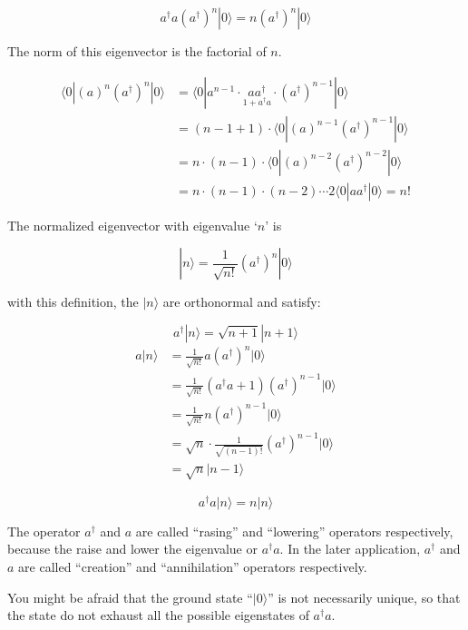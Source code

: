 ﻿\documentclass[twoside]{book}
\numberwithin{equation}{section}
\begin{document}
\[a^{\dagger}a(a^{\dagger})^n|0\rangle = n(a^{\dagger})^n|0\rangle \]

The norm of this eigenvector is the factorial of $n$.

\[\begin{split}
\langle 0|(a)^n(a^{\dagger})^n|0\rangle &=  \langle 0|a^{n-1}\cdot \underset{1+a^{\dagger}a}{aa^{\dagger}}\cdot(a^{\dagger})^{n-1}|0\rangle\\
&= (n-1+1)\cdot\langle 0|(a)^{n-1}(a^{\dagger})^{n-1}|0\rangle\\
&= n\cdot(n-1)\cdot\langle 0|(a)^{n-2}(a^{\dagger})^{n-2}|0\rangle\\
&= n\cdot(n-1)\cdot(n-2)\cdots 2 \langle 0|aa^{\dagger}|0\rangle = n!
\end{split}\]

The normalized eigenvector with eigenvalue `$n$' is

\begin{equation}
|n\rangle = \frac{1}{\sqrt{n!}}(a^{\dagger})^n|0\rangle
\end{equation}

with this definition, the $|n\rangle$ are orthonormal and satisfy:

\begin{equation}\label{1.1.2}
a^{\dagger}|n\rangle = \sqrt{n+1}|n+1\rangle
\end{equation}
\begin{equation}\label{1.1.3}
\begin{split}
a|n\rangle &= \frac{1}{\sqrt{n!}}a(a^{\dagger})^n|0\rangle\\
&=\frac{1}{\sqrt{n!}}(a^{\dagger}a+1)(a^{\dagger})^{n-1}|0\rangle\\
&=\frac{1}{\sqrt{n!}}n(a^{\dagger})^{n-1}|0\rangle\\
&=\sqrt{n}\cdot\frac{1}{\sqrt{(n-1)!}}(a^{\dagger})^{n-1}|0\rangle\\
&=\sqrt{n}|n-1\rangle
\end{split}
\end{equation}

\[a^{\dagger}a|n\rangle = n|n\rangle \]

The operator $a^{\dagger}$ and $a$ are called ``rasing'' and ``lowering'' operators respectively, because the raise and lower the eigenvalue or $a^{\dagger}a$.
In the later application, $a^{\dagger}$ and $a$ are called ``creation'' and ``annihilation'' operators respectively.

You might be afraid that the ground state ``$|0\rangle$'' is not necessarily unique, so that the state do not exhaust all the possible eigenstates of $a^{\dagger}a$.
\end{document}
